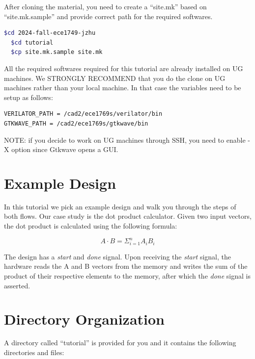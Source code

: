 \documentclass[12pt]{article}
\begin{document}
After cloning the material, you need to create a “site.mk” based on
“site.mk.sample” and provide correct path for the required softwares.

\begin{lstlisting}[language=bash]
  $cd 2024-fall-ece1749-jzhu
  $cd tutorial
  $cp site.mk.sample site.mk
\end{lstlisting}

All the required softwares required for this tutorial are already
installed on UG machines. We STRONGLY RECOMMEND that you do the clone
on UG machines rather than your local machine. In that case the
variables need to be setup as follows:

\begin{lstlisting}[language=bash]
VERILATOR_PATH = /cad2/ece1769s/verilator/bin
GTKWAVE_PATH = /cad2/ece1769s/gtkwave/bin
\end{lstlisting}

NOTE: if you decide to work on UG machines through SSH, you need to
enable -X option since Gtkwave opens a GUI.

\section{Example Design}

In this tutorial we pick an example design and walk you through the
steps of both flows. Our case study is the dot product
calculator. Given two input vectors, the dot product is calculated
using the following formula:

\[
A \cdot B = \Sigma_{i=1}^{n} A_i B_i
\]

The design has a {\em start} and {\em done} signal. Upon receiving the
{\em start} signal, the hardware reads the A and B vectors from the
memory and writes the sum of the product of their respective elements
to the memory, after which the {\em done} signal is asserted.

\section{Directory Organization}

A directory called “tutorial” is provided for you and it contains the
following directories and files:
\end{document}
